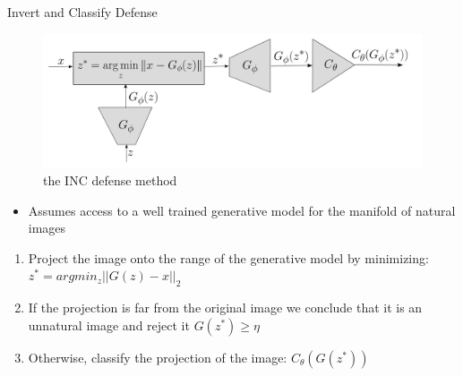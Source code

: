 \documentclass[10pt]{beamer}
\begin{document}
\begin{frame}[fragile]{Invert and Classify Defense}
    \begin{figure}[H]
    \caption{the INC defense method}
    \centering
    \includegraphics[scale=0.13]{./INC_diagram.png}
\end{figure}
    \begin{itemize}
    \item Assumes access to a well trained generative model for the manifold of natural images \cite{ilyas2017}
    \end{itemize}
    \begin{enumerate}
        \item Project the image onto the range of the generative model by minimizing:
        $z^* = argmin_z ||G(z) - x||_2$
        \item If the projection is far from the original image we conclude that it is an unnatural image and reject it
        $G(z^*) \geq \eta$
        \item Otherwise, classify the projection of the image:
        $C_\theta(G(z^*))$
    \end{enumerate}
\end{frame}
\end{document}
